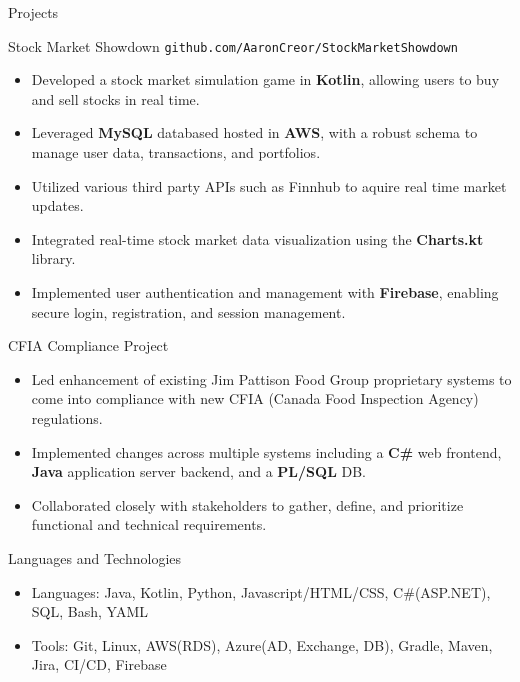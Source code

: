 \documentclass[]{mcdowellcv}
\begin{document}
	\begin{cvsection}{Projects}
		\begin{cvsubsection}{Stock Market Showdown}{}{}
		\texttt{github.com/AaronCreor/StockMarketShowdown}
			\begin{itemize}
				\item Developed a stock market simulation game in \textbf{Kotlin}, allowing users to buy and sell stocks in real time.
				\item Leveraged \textbf{MySQL} databased hosted in \textbf{AWS}, with a robust schema to manage user data, transactions, and portfolios.
				\item Utilized various third party APIs such as Finnhub to aquire real time market updates.
				\item Integrated real-time stock market data visualization using the \textbf{Charts.kt} library.
				\item Implemented user authentication and management with \textbf{Firebase}, enabling secure login, registration, and session management.
			\end{itemize}
		\end{cvsubsection}
		\begin{cvsubsection}{CFIA Compliance Project}{}{}
			\begin{itemize}
				\item Led enhancement of existing Jim Pattison Food Group proprietary systems to come into compliance with new CFIA (Canada Food Inspection Agency) regulations.
				\item Implemented changes across multiple systems including a \textbf{C\#} web frontend, \textbf{Java} application server backend, and a \textbf{PL/SQL} DB.
				\item Collaborated closely with stakeholders to gather, define, and prioritize functional and technical requirements.
			\end{itemize}
		\end{cvsubsection}
	\end{cvsection}
	
	\begin{cvsection}{Languages and Technologies}
		\begin{cvsubsection}{}{}{}	
			\begin{itemize}
				\item Languages: Java, Kotlin, Python, Javascript/HTML/CSS, C\#(ASP.NET), SQL, Bash, YAML
				\item Tools: Git, Linux, AWS(RDS), Azure(AD, Exchange, DB), Gradle, Maven, Jira, CI/CD, Firebase
			\end{itemize}
		\end{cvsubsection}
	\end{cvsection}
	
\end{document}
